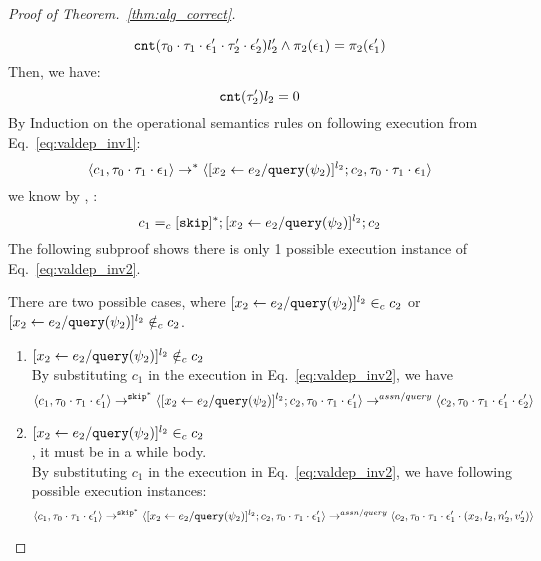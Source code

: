 \begin{proof}[Proof of Theorem.~\ref{thm:alg_correct}]
\begin{case}[$P(\cdot)$]
\[  \mathtt{cnt}(\mathtt{\tau}_0 \cdot \mathtt{\tau}_1 \cdot \mathtt{\epsilon}_1' \cdot \mathtt{\tau}_2' \cdot \mathtt{\epsilon}_2') l_2'
  \land 
  \pi_2(\mathtt{\epsilon}_1) = \pi_2(\mathtt{\epsilon}_1')
\] 
Then, we have:
\begin{equation}
\label{eq:valdep_invn}
  \mathtt{cnt}(\mathtt{\tau}_2') l_2 = 0
\end{equation}
%
%
%
 By Induction on the operational semantics rules on following execution from Eq.~\ref{eq:valdep_inv1}:
 \[\langle c_1, \mathtt{\tau}_0 \cdot \mathtt{\tau}_1 \cdot \mathtt{\epsilon}_1 \rangle
  \rightarrow^{*} 
  \langle [\mathrel{ {x}_2 \leftarrow e_2 / {\tt query}(\psi_2) }]^{l_2};{c}_2, 
  \mathtt{\tau}_0 \cdot \mathtt{\tau}_1 \cdot \mathtt{\epsilon}_1 \rangle \]
 we know by  , :
 \[
 c_1 =_c 
 [\mathtt{skip}]{}^*;[\mathrel{ {x}_2 \leftarrow e_2 / {\tt query}(\psi_2) }]^{l_2};{c}_2
 \]
The following subproof shows there is only 1 possible execution instance of Eq.~\ref{eq:valdep_inv2}.
\begin{subproof}[Subproof]
\label{pf:noiteration_inv2}
There are two possible cases, 
where $[\mathrel{ {x}_2 \leftarrow e_2 / {\tt query}(\psi_2) }]^{l_2} \in_c c_2$ 
or $[\mathrel{ {x}_2 \leftarrow e_2 / {\tt query}(\psi_2) }]^{l_2} \notin_c c_2$.
%
\begin{enumerate}
\item{$[\mathrel{ {x}_2 \leftarrow e_2 / {\tt query}(\psi_2) }]^{l_2}\notin_c c_2$}
\\
By substituting $c_1$ in the execution in Eq.~\ref{eq:valdep_inv2}, we have 
  \[
  \langle c_1, \mathtt{\tau}_0 \cdot \mathtt{\tau}_1 \cdot \mathtt{\epsilon}_1' \rangle 
  \rightarrow^{\mathtt{skip}^*} 
  \langle [\mathrel{ {x}_2 \leftarrow e_2 / {\tt query}(\psi_2) }]^{l_2} ; {c}_2, \mathtt{\tau}_0 \cdot \mathtt{\tau}_1 \cdot \mathtt{\epsilon}_1' \rangle 
  \rightarrow^{assn/query} 
  \langle {c}_2,  \mathtt{\tau}_0 \cdot \mathtt{\tau}_1 \cdot \mathtt{\epsilon}_1' \cdot \mathtt{\epsilon}_2' \rangle 
 \]
%
\item{$[\mathrel{ {x}_2 \leftarrow e_2 / {\tt query}(\psi_2) }]^{l_2} \in_c c_2$}
\\
, it must be in a while body.
\\
 By substituting $c_1$ in the execution in Eq.~\ref{eq:valdep_inv2}, we have following possible execution instances:
  \[
  \langle c_1, \mathtt{\tau}_0 \cdot \mathtt{\tau}_1 \cdot \mathtt{\epsilon}_1' \rangle 
  \rightarrow^{\mathtt{skip}^*} 
  \langle [\mathrel{ {x}_2 \leftarrow e_2 / {\tt query}(\psi_2) }]^{l_2} ; {c}_2, \mathtt{\tau}_0 \cdot \mathtt{\tau}_1 \cdot \mathtt{\epsilon}_1' \rangle 
  \rightarrow^{assn/query} 
  \langle {c}_2,  \mathtt{\tau}_0 \cdot \mathtt{\tau}_1 \cdot \mathtt{\epsilon}_1' \cdot (x_2, l_2, n_2', v_2') \rangle 
\]
\end{enumerate}
\end{subproof}
\end{case}
\end{proof}
